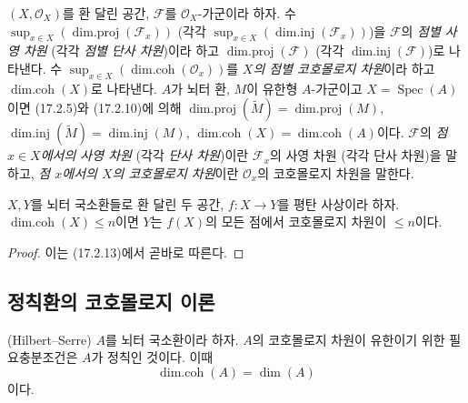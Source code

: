 \begin{env}[17.2.14]
\label{0.17.2.14-fr}
$(X,\mathscr{O}_X)$를 환 달린 공간, $\mathscr{F}$를
$\mathscr{O}_X$-가군이라 하자. 수
$\sup_{x\in X}(\operatorname{dim.proj}(\mathscr{F}_x))$ (각각
$\sup_{x\in X}(\operatorname{dim.inj}(\mathscr{F}_x))$)을
$\mathscr{F}$의 \emph{점별 사영 차원} (각각 \emph{점별 단사 차원})이라
하고 $\operatorname{dim.proj}(\mathscr{F})$ (각각
$\operatorname{dim.inj}(\mathscr{F})$)로 나타낸다. 수
$\sup_{x\in X}(\operatorname{dim.coh}(\mathscr{O}_x))$를
\emph{$X$의 점별 코호몰로지 차원}이라 하고
$\operatorname{dim.coh}(X)$로 나타낸다. $A$가 뇌터 환, $M$이 유한형
$A$-가군이고 $X=\operatorname{Spec}(A)$이면 (17.2.5)와 (17.2.10)에
의해
$\operatorname{dim.proj}(\widetilde{M})=\operatorname{dim.proj}(M)$,
$\operatorname{dim.inj}(\widetilde{M})=\operatorname{dim.inj}(M)$,
$\operatorname{dim.coh}(X)=\operatorname{dim.coh}(A)$이다.
$\mathscr{F}$의 \emph{점 $x\in X$에서의 사영 차원} (각각 \emph{단사
차원})이란 $\mathscr{F}_x$의 사영 차원 (각각 단사 차원)을 말하고,
\emph{점 $x$에서의 $X$의 코호몰로지 차원}이란 $\mathscr{O}_x$의
코호몰로지 차원을 말한다.
\end{env}

\begin{proposition}[17.2.15]
\label{0.17.2.15-fr}
$X,Y$를 뇌터 국소환들로 환 달린 두 공간,
$f:X\longrightarrow Y$를 평탄 사상이라 하자.
$\operatorname{dim.coh}(X)\leq n$이면 $Y$는 $f(X)$의 모든 점에서
코호몰로지 차원이 $\leq n$이다.
\end{proposition}

\begin{proof}
이는 (17.2.13)에서 곧바로 따른다.
\end{proof}

\subsection{정칙환의 코호몰로지 이론}
\label{subsection:0.17.3-fr}

\begin{theorem}[17.3.1]
\label{0.17.3.1-fr}
\textnormal{(Hilbert--Serre)} $A$를 뇌터 국소환이라 하자. $A$의
코호몰로지 차원이 유한이기 위한 필요충분조건은 $A$가 정칙인 것이다.
이때
\begin{equation}
\label{0.17.3.1.1-fr}
\tag{17.3.1.1}
  \operatorname{dim.coh}(A)=\dim(A)
\end{equation}
이다.
\end{theorem}

